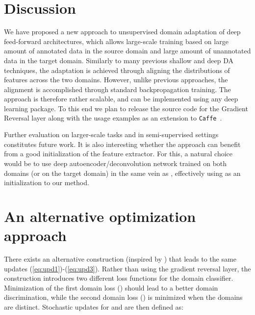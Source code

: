 \documentclass{article}
\newcommand{\eq}[1]{(\ref{eq:#1})}
\begin{document}
 \section{Discussion}

We have proposed a new approach to unsupervised domain adaptation of deep feed-forward architectures, which allows large-scale training based on large amount of annotated data in the source domain and large amount of unannotated data in the target domain. Similarly to many previous shallow and deep DA techniques, the adaptation is achieved through aligning the distributions of features across the two domains. However, unlike previous approaches, the alignment is accomplished through standard backpropagation training. The approach is therefore rather scalable, and can be implemented using any deep learning package. To this end we plan to release the source code for the Gradient Reversal layer along with the usage examples as an extension to \texttt{Caffe}~\cite{Jia14}.

Further evaluation on larger-scale tasks and in semi-supervised settings constitutes future work. It is also interesting whether the approach can benefit from a good initialization of the feature extractor. For this, a natural choice would be to use deep autoencoder/deconvolution network trained on both domains (or on the target domain) in the same vein as \cite{Glorot11,Chopra13}, effectively using \cite{Glorot11,Chopra13} as an initialization to our method.\newpage
 
\appendix
\renewcommand\thesection{Appendix \Alph{section}}
\def\x{{\mathbf x}}
\def\f{{\mathbf f}}

\def\S{{\cal S}}
\def\T{{\cal T}}

\def\R{{\mathds R}}

\def\tf{{\theta_f}}
\def\td{{\theta_d}}
\def\ty{{\theta_y}}
\def\htf{{\hat\theta_f}}
\def\htd{{\hat\theta_d}}
\def\hty{{\hat\theta_y}}


\section{An alternative optimization approach}
\label{sect:appendix_alternative}

There exists an alternative construction (inspired by \cite{Goodfellow14}) that leads to the same updates \eq{upd1}-\eq{upd3}. Rather than using the gradient reversal layer, the construction introduces two different loss functions for the domain classifier. Minimization of the first domain loss () should lead to a better domain discrimination, while the second domain loss () is minimized when the domains are distinct. Stochastic updates for  and  are then defined as:
\end{document}
